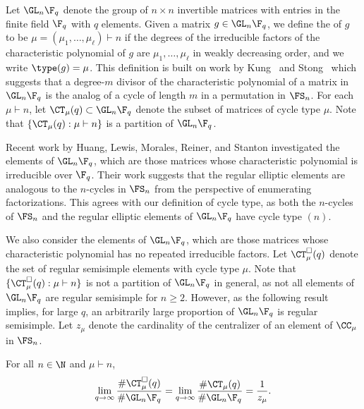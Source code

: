 Let \(\GL_n \F_q\) denote the group of \(n \times n\) invertible matrices with entries in the finite field \(\F_q\) with \(q\) elements.
Given a matrix \(g \in \GL_n \F_q\), we define the  of \(g\) to be \(\mu = (\mu_1,\ldots,\mu_\ell) \vdash n\) if the degrees of the irreducible factors of the characteristic polynomial of \(g\) are \(\mu_1,\ldots,\mu_\ell\) in weakly decreasing order, and we write \(\type (g) = \mu\).
This definition is built on work by Kung~\cite{kung} and Stong~\cite{stong} which suggests that a degree-\(m\) divisor of the characteristic polynomial of a matrix in \(\GL_n \F_q\) is the analog of a cycle of length \(m\) in a permutation in \(\FS_n\).
For each \(\mu \vdash n\), let \(\CT_\mu (q) \subset \GL_n \F_q\) denote the subset of matrices of cycle type \(\mu\).
Note that \(\{\CT_\mu (q) : \mu \vdash n\}\) is a partition of \(\GL_n \F_q\).

Recent work by Huang, Lewis, Morales, Reiner, and Stanton \cite{HLR, LM, refl_fact} investigated the  elements of \(\GL_n \F_q\), which are those matrices whose characteristic polynomial is irreducible over \(\F_q\).
Their work suggests that the regular elliptic elements are analogous to the \(n\)-cycles in \(\FS_n\) from the perspective of enumerating factorizations.
This agrees with our definition of cycle type, as both the \(n\)-cycles of \(\FS_n\) and the regular elliptic elements of \(\GL_n \F_q\) have cycle type \((n)\).







We also consider the  elements of \(\GL_n \F_q\), which are those matrices whose characteristic polynomial has no repeated irreducible factors.
Let \(\CT_\mu^\Box (q)\) denote the set of regular semisimple elements with cycle type \(\mu\).
Note that \(\{\CT_\mu^\Box (q) : \mu \vdash n\}\) is not a partition of \(\GL_n \F_q\) in general, as not all elements of \(\GL_n \F_q\) are regular semisimple for \(n \geq 2\).
However, as the following result implies, for large \(q\), an arbitrarily large proportion of \(\GL_n \F_q\) is regular semisimple.
Let \(z_\mu\) denote the cardinality of the centralizer of an element of \(\CC_\mu\) in \(\FS_n\).

\begin{corollary}
\label{cycle_type_ratio_limit}
For all \(n \in \N\) and \(\mu \vdash n\),
\label{dense}
\[
\lim_{q \to \infty} \frac{\# \CT_\mu^\Box (q)}{\# \GL_n \F_q} = \lim_{q \to \infty} \frac{\# \CT_\mu (q)}{\# \GL_n \F_q} = \frac{1}{z_\mu}.
\]
\end{corollary}

